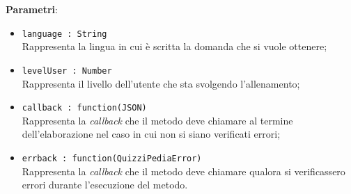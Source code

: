 \begin{itemize}
\begin{itemize}
			\textbf{Parametri}:
			\begin{itemize}
			\item \texttt{language : String} \\
			Rappresenta la lingua in cui è scritta la domanda che si vuole ottenere;
			\item \texttt{levelUser : Number} \\
			Rappresenta il livello dell'utente che sta svolgendo l'allenamento;
			\item \texttt{callback : function(JSON)} \\
			Rappresenta la \textit{callback} che il metodo deve chiamare al termine dell'elaborazione nel caso in cui non si siano verificati errori;
			\item \texttt{errback : function(QuizziPediaError)} \\
			Rappresenta la \textit{callback} che il metodo deve chiamare qualora si verificassero errori durante l'esecuzione del metodo.
			\end{itemize}
		\end{itemize}
\end{itemize}